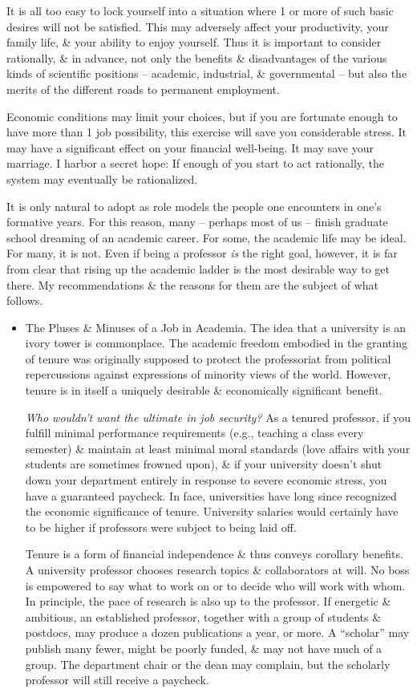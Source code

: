 \documentclass{article}
\begin{document}
\begin{enumerate}
\begin{itemize}
		It is all too easy to lock yourself into a situation where 1 or more of such basic desires will not be satisfied. This may adversely affect your productivity, your family life, \& your ability to enjoy yourself. Thus it is important to consider rationally, \& in advance, not only the benefits \& disadvantages of the various kinds of scientific positions -- academic, industrial, \& governmental -- but also the merits of the different roads to permanent employment.
		
		Economic conditions may limit your choices, but if you are fortunate enough to have more than 1 job possibility, this exercise will save you considerable stress. It may have a significant effect on your financial well-being. It may save your marriage. I harbor a secret hope: If enough of you start to act rationally, the system may eventually be rationalized.
		
		It is only natural to adopt as role models the people one encounters in one's formative years. For this reason, many -- perhaps most of us -- finish graduate school dreaming of an academic career. For some, the academic life may be ideal. For many, it is not. Even if being a professor \textit{is} the right goal, however, it is far from clear that rising up the academic ladder is the most desirable way to get there. My recommendations \& the reasons for them are the subject of what follows.
		\begin{itemize}
			\item {\sf The Pluses \& Minuses of a Job in Academia.} The idea that a university is an ivory tower is commonplace. The academic freedom embodied in the granting of tenure was originally supposed to protect the professoriat from political repercussions against expressions of minority views of the world. However, tenure is in itself a uniquely desirable \& economically significant benefit.
			
			\textit{Who wouldn't want the ultimate in job security?} As a tenured professor, if you fulfill minimal performance requirements (e.g., teaching a class every semester) \& maintain at least minimal moral standards (love affairs with your students are sometimes frowned upon), \& if your university doesn't shut down your department entirely in response to severe economic stress, you have a guaranteed paycheck. In face, universities have long since recognized the economic significance of tenure. University salaries would certainly have to be higher if professors were subject to being laid off.
			
			Tenure is a form of financial independence \& thus conveys corollary benefits. A university professor chooses research topics \& collaborators at will. No boss is empowered to say what to work on or to decide who will work with whom. In principle, the pace of research is also up to the professor. If energetic \& ambitious, an established professor, together with a group of students \& postdocs, may produce a dozen publications a year, or more. A ``scholar'' may publish many fewer, might be poorly funded, \& may not have much of a group. The department chair or the dean may complain, but the scholarly professor will still receive a paycheck.
			

\end{itemize}
\end{itemize}
\end{enumerate}
\end{document}
